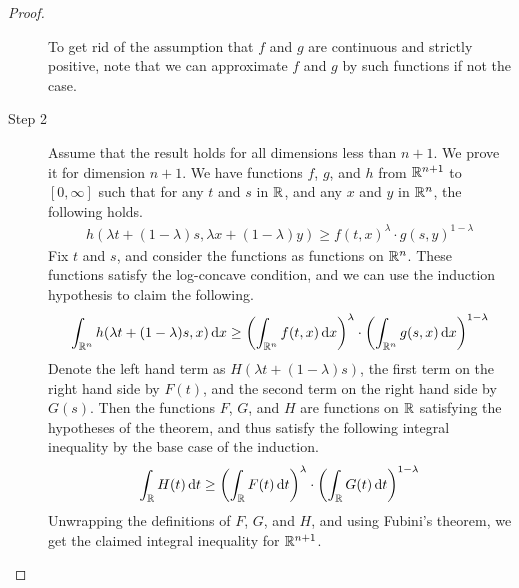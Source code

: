 \documentclass[11pt]{article}
\begin{document}
\begin{proof}
\begin{description}
    To get rid of the assumption that $f$ and $g$ are continuous and strictly positive, note that we can approximate $f$ and $g$ by such functions if not the case.
  \item[Step 2] Assume that the result holds for all dimensions less than $n+1$. We prove it for dimension $n+1$.
    We have functions $f$, $g$, and $h$ from $\mathbb{R}^{n+1}$ to $[0, \infty]$ such that for any $t$ and $s$ in $\mathbb{R}$, and any $x$ and $y$ in $\mathbb{R}^n$, the following holds.
    \begin{align*}
      h(\lambda t + (1-\lambda)s, \lambda x + (1-\lambda)y)
      \geq f(t, x)^{\lambda} \cdot g(s,y)^{1-\lambda}
    \end{align*}
    Fix $t$ and $s$, and consider the functions as functions on $\mathbb{R}^n$.
    These functions satisfy the log-concave condition, and we can use the induction hypothesis to claim the following.
    \begin{align*}
      \int_{\mathbb{R}^n} h(\lambda t + (1-\lambda)s, x) \mathrm{\,d} x
      \geq \left( \int_{\mathbb{R}^n} f(t,x) \mathrm{\,d} x \right)^{\lambda} \cdot \left( \int_{\mathbb{R}^n} g(s,x) \mathrm{\,d} x \right)^{1- \lambda}
    \end{align*}
    Denote the left hand term as $H(\lambda t + (1-\lambda)s)$, the first term on the right hand side by $F(t)$, and the second term on the right hand side by $G(s)$.
    Then the functions $F$, $G$, and $H$ are functions on $\mathbb{R}$ satisfying the hypotheses of the theorem, and thus satisfy the following integral inequality by the base case of the induction.
    \begin{align*}
      \int_{\mathbb{R}} H(t) \mathrm{\,d} t \geq \left( \int_{\mathbb{R}} F(t) \mathrm{\,d} t \right)^{\lambda} \cdot \left( \int_{\mathbb{R}} G(t) \mathrm{\,d} t \right)^{1-\lambda}
    \end{align*}
    Unwrapping the definitions of $F$, $G$, and $H$, and using Fubini's theorem, we get the claimed integral inequality for $\mathbb{R}^{n+1}$.
  \end{description}
\end{proof}


\printbibliography
\end{document}
